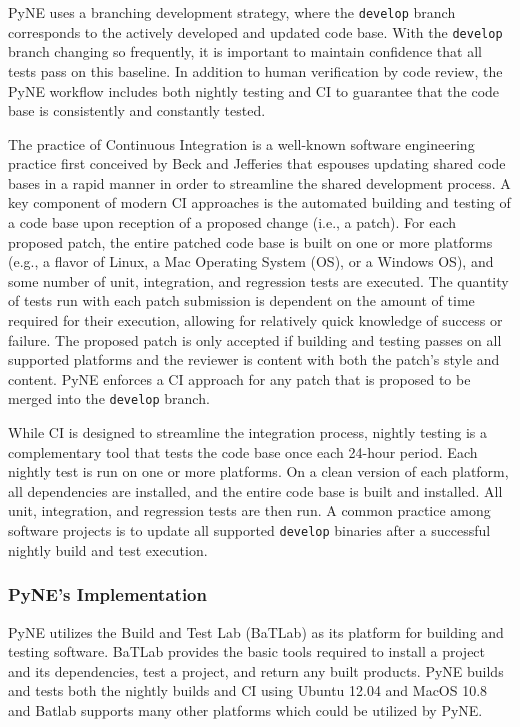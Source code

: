 \documentclass{anstrans}
\begin{document}
PyNE uses a branching
development strategy, where the \texttt{develop} branch corresponds to the
actively developed and updated code base.
With the \texttt{develop} branch changing so frequently, it is important to maintain confidence that all tests pass on this baseline.
In addition to human verification by code review, the PyNE
workflow includes both nightly testing and CI to
guarantee that the code base is consistently and constantly tested.

The practice of Continuous Integration is a well-known software engineering
practice first conceived by Beck and Jefferies \cite{beck1998extreme} that
espouses updating shared code bases in a rapid manner in order to streamline the
shared development process. A key component of modern CI approaches is the
automated building and testing of a code base upon reception of a proposed
change (i.e., a patch). For each proposed patch, the entire patched code base is
built on one or more platforms (e.g., a flavor of Linux, a Mac Operating System
(OS), or a Windows OS), and some number of unit, integration, and regression
tests are executed. The quantity of tests run with each patch submission is
dependent on the amount of time required for their execution, allowing for
relatively quick knowledge of success or failure. The proposed patch is only
accepted if building and testing passes on all supported platforms and the
reviewer is content with both the patch's style and content. PyNE enforces a CI
approach for any patch that is proposed to be merged into the \texttt{develop}
branch.

While CI is designed to streamline the integration process, nightly testing is a
complementary tool that tests the code base once each 24-hour
period. Each nightly test is run on one or more platforms. On a clean version of
each platform, all dependencies are installed, and the entire code base is built
and installed. All unit, integration, and regression tests are then run. 
A common practice among software projects is to update all supported \texttt{develop}
binaries after a successful nightly build and test execution.

\subsubsection{PyNE's Implementation}

PyNE utilizes the Build and Test Lab (BaTLab) \cite{batlab_2014} as its platform for 
building and testing software. BaTLab provides the basic tools required to
install a project and its dependencies, test a project, and return any built
products. PyNE builds and tests both the nightly builds and CI using
Ubuntu 12.04 and MacOS 10.8 and Batlab supports many other platforms which could be utilized by PyNE.
\end{document}
